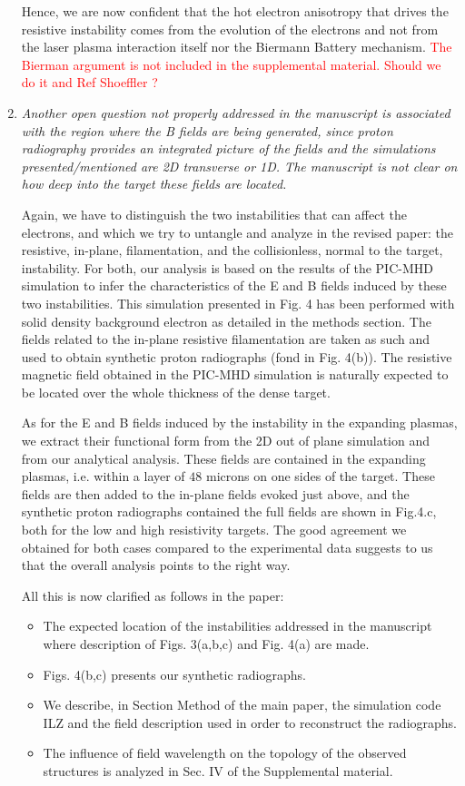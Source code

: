 \documentclass{article}
\begin{document}
\begin{enumerate}
Hence, we are now confident that the hot electron anisotropy that drives the resistive instability  comes from the evolution of the electrons and not from the laser plasma interaction itself nor the Biermann Battery mechanism. \textcolor{red}{ The Bierman argument is not included in the supplemental material.  Should we do it and  Ref Shoeffler ?  }

\item \textit{ Another open question not properly addressed in the manuscript is associated with the region where the B fields are being generated, since proton radiography provides an integrated picture of the fields and the simulations presented/mentioned are 2D transverse or 1D. The manuscript is not clear on how deep into the target these fields are located. }

Again, we have to distinguish the two instabilities that can affect the electrons, and which we try to untangle and analyze in the revised paper: the resistive, in-plane, filamentation, and the collisionless, normal to the target, instability. 
For both,  our analysis is based on the results of the PIC-MHD simulation to infer the characteristics of the E and B fields induced by these two instabilities. This simulation presented in Fig. 4 has been performed with solid density background   electron as detailed in the methods section. The fields related to the in-plane resistive filamentation are taken as such and used to obtain synthetic proton radiographs (fond in Fig. 4(b)). The resistive magnetic field   obtained in the PIC-MHD simulation is naturally expected to be located over the whole thickness of the dense target.  

As for the E and  B fields induced by the instability in the expanding plasmas, we extract their functional form from the 2D out of plane simulation and from our analytical analysis. These fields are contained in the expanding plasmas, i.e. within a layer of $48$ microns on one sides of the target. 
These fields are then added to the in-plane fields evoked just above, and the synthetic proton radiographs contained the full fields are shown in Fig.4.c, both for the low and high resistivity targets. The good agreement we obtained for both cases compared to the experimental data suggests to us that the overall analysis points to the right way.

All this is now clarified as follows in the paper:
\begin{itemize}
    \item The expected location of the instabilities addressed in the manuscript where description of  Figs. 3(a,b,c) and Fig. 4(a) are made.
    \item Figs. 4(b,c) presents our synthetic radiographs.
    \item We describe,  in Section Method of the main paper,  the simulation code ILZ and the field description used in order to reconstruct the radiographs.
    \item The influence of field wavelength on the topology of the observed structures is analyzed in Sec. IV of the Supplemental material. 
\end{itemize}


\end{enumerate}
\end{document}
